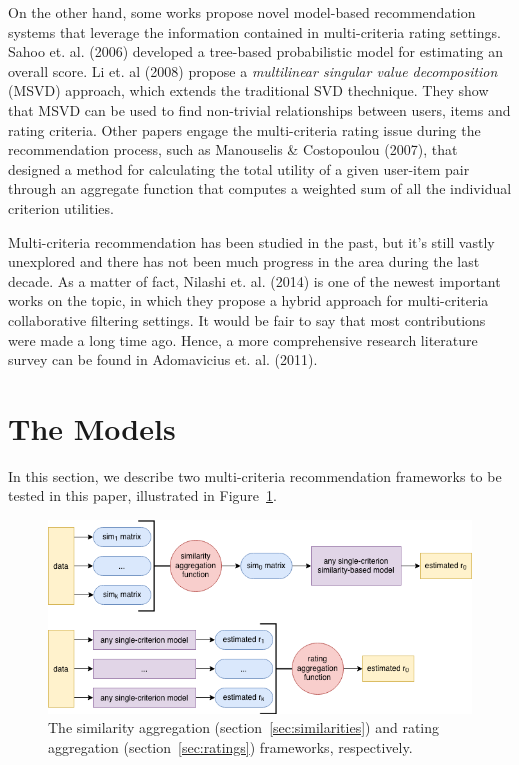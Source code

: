 \documentclass[sigconf,authordraft]{acmart}
\begin{document}
On the other hand, some works propose novel model-based recommendation systems that leverage the information contained in multi-criteria rating settings. Sahoo et. al. (2006) developed a tree-based probabilistic model for estimating an overall score. Li et. al (2008) propose a \textit{multilinear singular value decomposition} (MSVD) approach, which extends the traditional SVD thechnique. They show that MSVD can be used to find non-trivial relationships between users, items and rating criteria. Other papers engage the multi-criteria rating issue during the recommendation process, such as Manouselis \& Costopoulou (2007), that designed a method for calculating the total utility of a given user-item pair through an aggregate function that computes a weighted sum of all the individual criterion utilities.

Multi-criteria recommendation has been studied in the past, but it's still vastly unexplored and there has not been much progress in the area during the last decade. As a matter of fact, Nilashi et. al. (2014) is one of the newest important works on the topic, in which they propose a hybrid approach for multi-criteria collaborative filtering settings. It would be fair to say that most contributions were made a long time ago. Hence, a more comprehensive research literature survey can be found in Adomavicius et. al. (2011).

\section{The Models}

In this section, we describe two multi-criteria recommendation frameworks to be tested in this paper, illustrated in Figure~\ref{fig:diagram}.

\begin{figure}[h]
  \centering
  \includegraphics[scale=0.5]{static/diagram.png}
  \caption{The similarity aggregation (section~\ref{sec:similarities}) and rating aggregation (section~\ref{sec:ratings}) frameworks, respectively.}
  \label{fig:diagram}
\end{figure}
\end{document}
